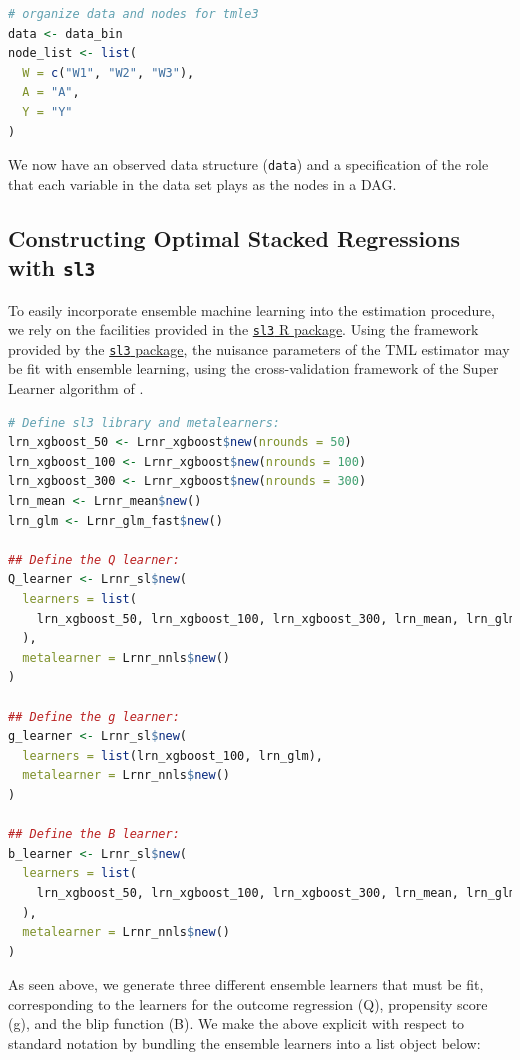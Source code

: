 \documentclass[12pt, krantz2,]{krantz}
\newcommand{\passthrough}[1]{#1}
\theoremstyle{definition}
\theoremstyle{definition}
\theoremstyle{definition}
\newcommand{\1}{\mathbbm{1}}
\begin{document}
\begin{lstlisting}[language=R]
# organize data and nodes for tmle3
data <- data_bin
node_list <- list(
  W = c("W1", "W2", "W3"),
  A = "A",
  Y = "Y"
)
\end{lstlisting}

We now have an observed data structure (\passthrough{\lstinline!data!}) and a specification of the role
that each variable in the data set plays as the nodes in a DAG.

\hypertarget{constructing-optimal-stacked-regressions-with-sl3}{%
\subsection{\texorpdfstring{Constructing Optimal Stacked Regressions with \texttt{sl3}}{Constructing Optimal Stacked Regressions with sl3}}\label{constructing-optimal-stacked-regressions-with-sl3}}

To easily incorporate ensemble machine learning into the estimation procedure,
we rely on the facilities provided in the \href{https://tlverse.org/sl3}{\passthrough{\lstinline!sl3!} R
package}. Using the framework provided by the \href{https://tlverse.org/sl3}{\passthrough{\lstinline!sl3!}
package}, the nuisance parameters of the TML estimator
may be fit with ensemble learning, using the cross-validation framework of the
Super Learner algorithm of \citet{vdl2007super}.

\begin{lstlisting}[language=R]
# Define sl3 library and metalearners:
lrn_xgboost_50 <- Lrnr_xgboost$new(nrounds = 50)
lrn_xgboost_100 <- Lrnr_xgboost$new(nrounds = 100)
lrn_xgboost_300 <- Lrnr_xgboost$new(nrounds = 300)
lrn_mean <- Lrnr_mean$new()
lrn_glm <- Lrnr_glm_fast$new()

## Define the Q learner:
Q_learner <- Lrnr_sl$new(
  learners = list(
    lrn_xgboost_50, lrn_xgboost_100, lrn_xgboost_300, lrn_mean, lrn_glm
  ),
  metalearner = Lrnr_nnls$new()
)

## Define the g learner:
g_learner <- Lrnr_sl$new(
  learners = list(lrn_xgboost_100, lrn_glm),
  metalearner = Lrnr_nnls$new()
)

## Define the B learner:
b_learner <- Lrnr_sl$new(
  learners = list(
    lrn_xgboost_50, lrn_xgboost_100, lrn_xgboost_300, lrn_mean, lrn_glm
  ),
  metalearner = Lrnr_nnls$new()
)
\end{lstlisting}

As seen above, we generate three different ensemble learners that must be fit,
corresponding to the learners for the outcome regression (Q), propensity score
(g), and the blip function (B). We make the above explicit with respect to
standard notation by bundling the ensemble learners into a list object below:
\end{document}
